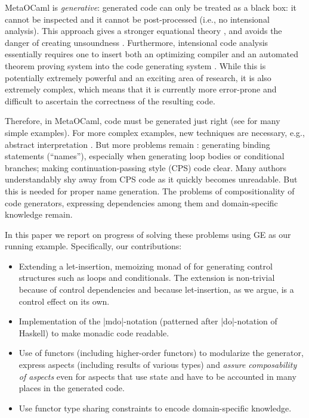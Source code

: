 \documentclass{llncs}
\begin{document}
MetaOCaml is \emph{generative}: generated code can only be treated as
a black box: it cannot be inspected and it cannot be post-processed
(i.e., no intensional analysis). This approach gives a stronger
equational theory \cite{Taha2000}, and avoids the danger of creating
unsoundness \cite{TahaThesis}. Furthermore, intensional code analysis
essentially requires one to insert both an optimizing compiler and an
automated theorem proving system into the code generating system
\cite{Pueschel:05,Kennedy01Telescoping,dongarra7,Veldhuizen:2004}.
While this is potentially extremely powerful and an exciting area of
research, it is also extremely complex, which means that it is
currently more error-prone and difficult to ascertain the correctness
of the resulting code.

Therefore, in MetaOCaml, code must be generated just right (see
\cite{TahaThesis} for many simple examples).  For more complex
examples, new techniques are necessary, e.g., abstract interpretation
\cite{KiselyovTaha}.  But more problems remain
\cite{Padua:MetaOcaml:04}: generating binding statements (``names''),
especially when generating loop bodies or conditional branches; making
continuation-passing style (CPS) code clear.  Many authors
understandably shy away from CPS code as it quickly becomes
unreadable.  But this is needed for proper name generation.
The problems of compositionality of code generators, expressing
dependencies among them and domain-specific knowledge remain.

In this paper we report on progress of solving these problems using GE
as our running example. Specifically, our contributions:
\vspace*{-2pt}
\begin{itemize}
    \item Extending a let-insertion, memoizing monad of
      \cite{MSP:PADL04,KiselyovTaha} for generating control structures
      such as loops and conditionals. The extension is non-trivial
      because of control dependencies and because
      let-insertion, as we argue, is a control effect on its own.
\begin{comment}
      : e.g.,\\
      |let x = exp in ...| has a different \emph{effect} within a
      conditional branch.
\end{comment}
    \item Implementation of the |mdo|-notation (patterned after
      |do|-notation of Haskell) to make monadic code readable.
    \item Use of functors (including higher-order functors) to
      modularize the generator, express aspects (including results of
      various types) and \emph{assure composability of aspects} even
      for aspects that use state and have to be accounted in many
      places in the generated code.
    \item Use functor type sharing constraints to encode domain-specific
      knowledge.
\end{itemize}
\end{document}

